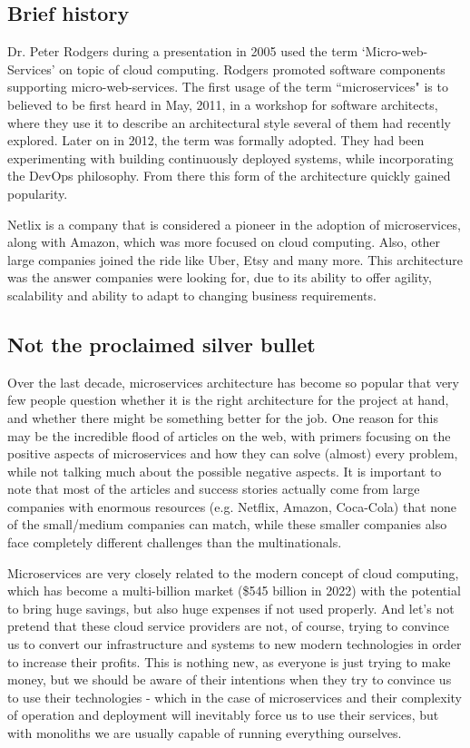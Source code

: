 \subsection{Brief history}
Dr. Peter Rodgers during a presentation in 2005 used the term `Micro-web-Services' on topic of cloud computing. Rodgers promoted software components supporting micro-web-services. The first usage of the term ``microservices" is to believed to be first heard in May, 2011, in a workshop for software architects, where they use it to describe an architectural style several of them had recently explored. Later on in 2012, the term was formally adopted. They had been experimenting with building continuously deployed systems, while incorporating the DevOps philosophy. From there this form of the architecture quickly gained popularity. \cite{BRIEF_HISTORY_OF_MS}

Netlix is a company that is considered a pioneer in the adoption of microservices, along with Amazon, which was more focused on cloud computing. Also, other large companies joined the ride like Uber, Etsy and many more. This architecture was the answer companies were looking for, due to its ability to offer agility, scalability and ability to adapt to changing business requirements. \cite{MS_COMPANIES}


\subsection{Not the proclaimed silver bullet}
Over the last decade, microservices architecture has become so popular that very few people question whether it is the right architecture for the project at hand, and whether there might be something better for the job. One reason for this may be the incredible flood of articles on the web, with primers focusing on the positive aspects of microservices and how they can solve (almost) every problem, while not talking much about the possible negative aspects. It is important to note that most of the articles and success stories actually come from large companies with enormous resources (e.g. Netflix, Amazon, Coca-Cola) that none of the small/medium companies can match, while these smaller companies also face completely different challenges than the multinationals.

Microservices are very closely related to the modern concept of cloud computing, which has become a multi-billion market (\$545 billion in 2022\cite{CC_MARKET_SIZE}) with the potential to bring huge savings, but also huge expenses if not used properly. And let's not pretend that these cloud service providers are not, of course, trying to convince us to convert our infrastructure and systems to new modern technologies in order to increase their profits. This is nothing new, as everyone is just trying to make money, but we should be aware of their intentions when they try to convince us to use their technologies - which in the case of microservices and their complexity of operation and deployment will inevitably force us to use their services, but with monoliths we are usually capable of running everything ourselves.

